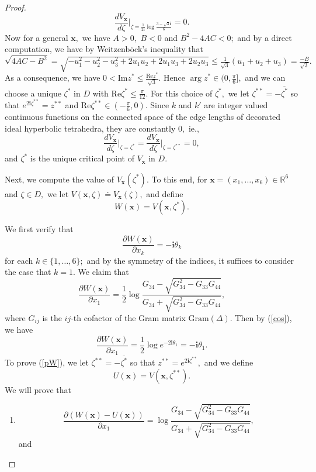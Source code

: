 \documentclass[10pt,a4paper]{amsart}
\begin{document}
\begin{proof}
$$\frac{d V_{\boldsymbol x}}{d\zeta}\Big|_{\zeta=\frac{1}{2\mathbf i}\log \frac{3-\sqrt{3}\mathbf i}{6}}=0.$$ 
Now for a general $\boldsymbol x,$  we have $A>0,$ $B<0$ and $B^2-4AC<0;$ and by a direct computation, we have by Weitzenb\"ock's inequality that  $\sqrt{4AC-B^2}=\sqrt{-u_1^2-u_2^2-u_3^2+2u_1u_2+2u_1u_3+2u_2u_3}\leqslant \frac{1}{\sqrt{3}}(u_1+u_2+u_3)=\frac{-B}{\sqrt 3}.$ As a consequence, we have $0<\mathrm{Im}z^*\leqslant \frac{\mathrm{Re}z^*}{\sqrt{3}}.$ Hence $\arg z^* \in (0,\frac{\pi}{6}],$ and  we can choose a unique $\zeta^*$ in $D$ with $\mathrm{Re}\zeta^*\leqslant \frac{\pi}{12}.$  For this choice of $\zeta^*,$ we let $\zeta^{**}=-\overline{\zeta^*}$ so that $e^{2\mathbf i\zeta^{**}}=z^{**}$ and $\mathrm{Re}\zeta^{**}\in (-\frac{\pi}{6},0).$
Since $k$ and $k'$ are integer valued continuous functions on the connected space of the edge lengths of decorated ideal hyperbolic tetrahedra, they are constantly $0,$ ie., 
\begin{equation}\label{=0}
\frac{d V_{\boldsymbol x}}{d \zeta}\Big|_{\zeta=\zeta^*}=\frac{d V_{\boldsymbol x}}{d \zeta}\Big|_{\zeta=\zeta^{**}}=0,
\end{equation}
and $\zeta^*$ is the unique critical point of $V_{\boldsymbol x}$ in  $D.$
\bigskip

Next, we compute the value of  $V_{\boldsymbol x}(\zeta^*).$ To this end, for $\boldsymbol x=(x_1,\dots,x_6)\in \mathbb R^6$ and $\zeta\in D,$ we let 
$V(\boldsymbol x,\zeta)\doteq V_{\boldsymbol x}(\zeta),$ and define 
\begin{equation}\label{W}
W(\boldsymbol x)=V({\boldsymbol x},\zeta^*).
\end{equation}

We first verify that 
\begin{equation}\label{co-sch2}
    \frac{\partial W(\boldsymbol x)}{\partial x_k}=-\mathbf i\theta_k
\end{equation}
for each $k\in\{1,\dots,6\};$ and by the symmetry of the indices, it suffices to consider the case that $k=1.$ 
We claim that 
\begin{equation}\label{pW}
\frac{\partial W(\boldsymbol x)}{\partial x_1}=\frac{1}{2}\log\frac{G_{34}-\sqrt{G_{34}^2-G_{33}G_{44}}}{G_{34}+\sqrt{G_{34}^2-G_{33}G_{44}}},
\end{equation}
where $G_{ij}$ is the $ij$-th cofactor of the Gram matrix $\mathrm{Gram}(\Delta).$ Then by (\ref{cos}), we have 
$$\frac{\partial W(\boldsymbol x)}{\partial x_1}=\frac{1}{2}\log e^{-2\mathbf i\theta_1}=-\mathbf i\theta_1.$$
To prove (\ref{pW}), we let $\zeta^{**}=-\overline {\zeta^*}$ so that $z^{**}=e^{2\mathbf i\zeta^{**}},$ and we define 
$$U(\boldsymbol x)= V(\boldsymbol x,\zeta^{**}).$$
We  will prove that 
\begin{enumerate}[(1)]
    \item  
    $$\frac{\partial (W(\boldsymbol x)-U(\boldsymbol x))}{\partial x_1}=\log\frac{G_{34}-\sqrt{G_{34}^2-G_{33}G_{44}}}{G_{34}+\sqrt{G_{34}^2-G_{33}G_{44}}},$$
    and 


\end{enumerate}
\end{proof}
\end{document}
